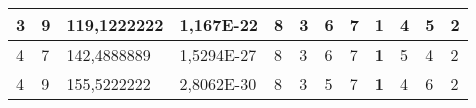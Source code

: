 \documentclass[conference]{IEEEtran}
\begin{document}
\begin{table*}[]
\begin{tabular}{|llll|llllllll|}
\multicolumn{1}{|l|}{3}                                                              & \multicolumn{1}{l|}{9}                                                                 & \multicolumn{1}{l|}{119,1222222}                                                           & 1,167E-22                               & \multicolumn{1}{l|}{8}                                                           & \multicolumn{1}{l|}{3}                                                           & \multicolumn{1}{l|}{6}                                                           & \multicolumn{1}{l|}{7}                                                           & \multicolumn{1}{l|}{\textbf{1}}                                                  & \multicolumn{1}{l|}{4}                                                           & \multicolumn{1}{l|}{5}                                                           & 2                                   \\ \hline
\multicolumn{1}{|l|}{4}                                                              & \multicolumn{1}{l|}{7}                                                                 & \multicolumn{1}{l|}{142,4888889}                                                           & 1,5294E-27                              & \multicolumn{1}{l|}{8}                                                           & \multicolumn{1}{l|}{3}                                                           & \multicolumn{1}{l|}{6}                                                           & \multicolumn{1}{l|}{7}                                                           & \multicolumn{1}{l|}{\textbf{1}}                                                  & \multicolumn{1}{l|}{5}                                                           & \multicolumn{1}{l|}{4}                                                           & 2                                   \\ \hline
\multicolumn{1}{|l|}{4}                                                              & \multicolumn{1}{l|}{9}                                                                 & \multicolumn{1}{l|}{155,5222222}                                                           & 2,8062E-30                              & \multicolumn{1}{l|}{8}                                                           & \multicolumn{1}{l|}{3}                                                           & \multicolumn{1}{l|}{5}                                                           & \multicolumn{1}{l|}{7}                                                           & \multicolumn{1}{l|}{\textbf{1}}                                                  & \multicolumn{1}{l|}{4}                                                           & \multicolumn{1}{l|}{6}                                                           & 2                                   \\ \hline

\end{tabular}
\end{table*}
\end{document}
